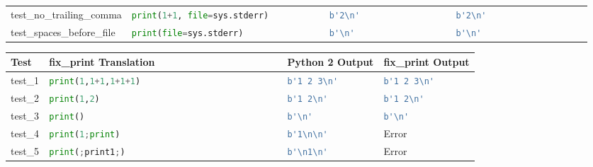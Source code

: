 \begin{table}[ht]
\begin{tabular}{@{}l|llll@{}}
    test\_no\_trailing\_comma             & \lstinline[language=Python, style=pythonstyle]|print(1+1, file=sys.stderr)          | & \lstinline[language=Python, style=pythonstyle]|b'2\n'                 | & \lstinline[language=Python, style=pythonstyle]|b'2\n'                 | \\ 
    test\_spaces\_before\_file            & \lstinline[language=Python, style=pythonstyle]|print(file=sys.stderr)               | & \lstinline[language=Python, style=pythonstyle]|b'\n'                  | & \lstinline[language=Python, style=pythonstyle]|b'\n'                  | \\ \bottomrule
    \end{tabular}
\end{table}

\begin{table}[ht]
    \begin{tabular}{@{}l|lll@{}}
    \toprule
    Test                                  & fix\_print Translation                        & Python 2 Output                        & fix\_print Output             \\ \midrule
    test\_1                               & \lstinline[language=Python, style=pythonstyle]|print(1,1+1,1+1+1)                           | & \lstinline[language=Python, style=pythonstyle]|b'1 2 3\n'   |           & \lstinline[language=Python, style=pythonstyle]|b'1 2 3\n'    | \\
    test\_2                               & \lstinline[language=Python, style=pythonstyle]|print(1,2)                                   | & \lstinline[language=Python, style=pythonstyle]|b'1 2\n'  |              & \lstinline[language=Python, style=pythonstyle]|b'1 2\n'      | \\
    test\_3                               & \lstinline[language=Python, style=pythonstyle]|print()                                      | & \lstinline[language=Python, style=pythonstyle]|b'\n'   |                & \lstinline[language=Python, style=pythonstyle]|b'\n'         | \\
    test\_4                               & \lstinline[language=Python, style=pythonstyle]|print(1;print)                               | & \lstinline[language=Python, style=pythonstyle]|b'1\n\n'| & Error                         \\
    test\_5                               & \lstinline[language=Python, style=pythonstyle]|print(;print1;)                              | & \lstinline[language=Python, style=pythonstyle]|b'\n1\n'| & Error                         \\

\end{tabular}
\end{table}
